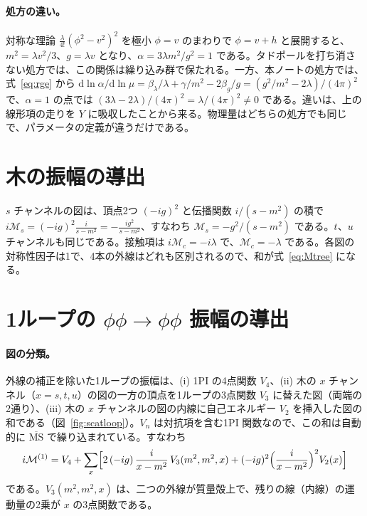 \documentclass[a4paper,10pt]{ltjsarticle}
\newcommand{\dd}{\mathrm{d}}
\begin{document}
\paragraph{処方の違い。}対称な理論 $\frac{\lambda}{4!}(\phi^2-v^2)^2$ を極小 $\phi=v$ のまわりで $\phi=v+h$ と展開すると、$m^2=\lambda v^2/3$、$g=\lambda v$ となり、$\alpha=3\lambda m^2/g^2=1$ である。タドポールを打ち消さない処方では、この関係は繰り込み群で保たれる。一方、本ノートの処方では、式~\eqref{eq:rge} から $\dd\ln\alpha/\dd\ln\mu=\beta_\lambda/\lambda+\gamma/m^2-2\beta_g/g=(g^2/m^2-2\lambda)/(4\pi)^2$ で、$\alpha=1$ の点では $(3\lambda-2\lambda)/(4\pi)^2=\lambda/(4\pi)^2\neq0$ である。違いは、上の線形項の走りを $Y$ に吸収したことから来る。物理量はどちらの処方でも同じで、パラメータの定義が違うだけである。

\section{木の振幅の導出}\label{app:tree}

$s$ チャンネルの図は、頂点2つ $(-ig)^2$ と伝播関数 $i/(s-m^2)$ の積で $i\mathcal{M}_s=(-ig)^2\frac{i}{s-m^2}=-\frac{ig^2}{s-m^2}$、すなわち $\mathcal{M}_s=-g^2/(s-m^2)$ である。$t$、$u$ チャンネルも同じである。接触項は $i\mathcal{M}_c=-i\lambda$ で、$\mathcal{M}_c=-\lambda$ である。各図の対称性因子は1で、4本の外線はどれも区別されるので、和が式~\eqref{eq:Mtree} になる。

\section{1ループの $\phi\phi\to\phi\phi$ 振幅の導出}\label{app:scat}

\paragraph{図の分類。}外線の補正を除いた1ループの振幅は、(i) 1PI の4点関数 $V_4$、(ii) 木の $x$ チャンネル（$x=s,t,u$）の図の一方の頂点を1ループの3点関数 $V_3$ に替えた図（両端の2通り）、(iii) 木の $x$ チャンネルの図の内線に自己エネルギー $V_2$ を挿入した図の和である（図~\ref{fig:scatloop}）。$V_n$ は対抗項を含む1PI 関数なので、この和は自動的に $\overline{\mathrm{MS}}$ で繰り込まれている。すなわち
\begin{equation*}
i\mathcal{M}^{(1)}=V_4+\sum_x\Bigl[2\,(-ig)\,\frac{i}{x-m^2}\,V_3(m^2,m^2,x)+(-ig)^2\Bigl(\frac{i}{x-m^2}\Bigr)^2V_2(x)\Bigr]
\end{equation*}
である。$V_3(m^2,m^2,x)$ は、二つの外線が質量殻上で、残りの線（内線）の運動量の2乗が $x$ の3点関数である。
\end{document}
